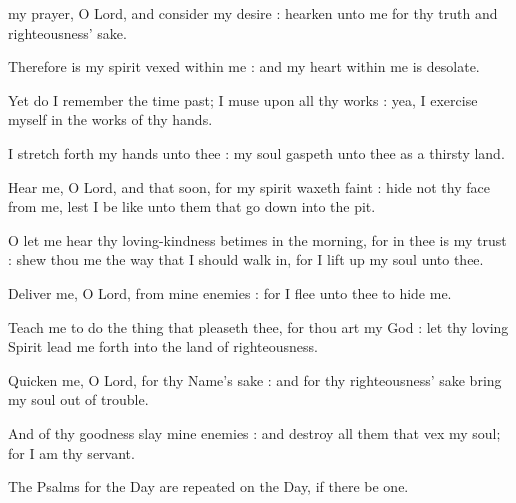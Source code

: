 
 my prayer, O Lord, and consider my desire : hearken unto me for thy truth and righteousness' sake.\par
{}
Therefore is my spirit vexed within me : and my heart within me is desolate.\par
{}Yet do I remember the time past; I muse upon all thy works : yea, I exercise myself in the works of thy hands.\par
{}I stretch forth my hands unto thee : my soul gaspeth unto thee as a thirsty land.\par
{}Hear me, O Lord, and that soon, for my spirit waxeth faint : hide not thy face from me, lest I be like unto them that go down into the pit.\par
{}O let me hear thy loving-kindness betimes in the morning, for in thee is my trust : shew thou me the way that I should walk in, for I lift up my soul unto thee.\par
{}Deliver me, O Lord, from mine enemies : for I flee unto thee to hide me.\par
{}Teach me to do the thing that pleaseth thee, for thou art my God : let thy loving Spirit lead me forth into the land of righteousness.\par
{}Quicken me, O Lord, for thy Name's sake : and for thy righteousness' sake bring my soul out of trouble.\par
{}And of thy goodness slay mine enemies : and destroy all them that vex my soul; for I am thy servant.\par

\begin{secrubric}
    The Psalms for the  Day are repeated on the  Day, if there be one.
\end{secrubric}


